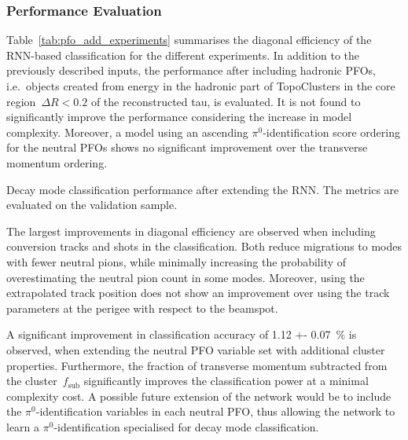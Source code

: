 \subsubsection{Performance Evaluation}

Table~\ref{tab:pfo_add_experiments} summarises the diagonal efficiency of the
RNN-based classification for the different experiments. In addition to the
previously described inputs, the performance after including hadronic PFOs,
i.e.\ objects created from energy in the hadronic part of TopoClusters in the
core region~$\Delta R < 0.2$ of the reconstructed tau, is evaluated. It is not
found to significantly improve the performance considering the increase in model
complexity. Moreover, a model using an ascending $\pi^0$-identification score
ordering for the neutral PFOs shows no significant improvement over the
transverse momentum ordering.

\begin{table}[htb]
  \centering
  {\small}
  \caption{Decay mode classification performance after extending the RNN. The
    metrics are evaluated on the validation sample.}
  \label{tab:pfo_add_experiments}
\end{table}

The largest improvements in diagonal efficiency are observed when including
conversion tracks and shots in the classification. Both reduce migrations to
modes with fewer neutral pions, while minimally increasing the probability of
overestimating the neutral pion count in some modes. Moreover, using the
extrapolated track position does not show an improvement over using the track
parameters at the perigee with respect to the beamspot.

A significant improvement in classification accuracy of \SI{1.12 +-
  0.07}{\percent} is observed, when extending the neutral PFO variable set with
additional cluster properties. Furthermore, the fraction of transverse momentum
subtracted from the cluster~$f_\text{sub}$ significantly improves the
classification power at a minimal complexity cost. A possible future extension
of the network would be to include the $\pi^0$-identification variables in each
neutral PFO, thus allowing the network to learn a $\pi^0$-identification
specialised for decay mode classification.

